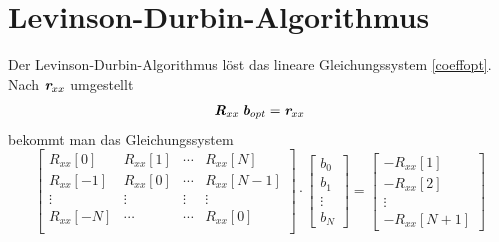\documentclass[
    10pt, %
    DIV12,
    english, %
    a5paper, %
    twoside, %
    titlepage, %
    parskip=half, %
    headings=small, %
    listof=totoc, %
    bibliography=totoc, %
    index=totoc, %
    captions=tableheading, %
    final %
]{scrbook}
\begin{document}
\section{Levinson-Durbin-Algorithmus}

Der Levinson-Durbin-Algorithmus löst das lineare Gleichungssystem \eqref{coeffopt}. Nach $\textit{\textbf{r}}_{xx}$ umgestellt
\begin{equation}
\textit{\textbf{R}}_{xx}\:\textit{\textbf{b}}_{opt}=\textit{\textbf{r}}_{xx}\nonumber
\end{equation}
bekommt man das Gleichungssystem
\begin{equation}\label{matrix1}
\begin{bmatrix} 
R_{xx}[0] & R_{xx}[1] & \cdots & R_{xx}[N]\\
R_{xx}[-1] & R_{xx}[0] & \cdots & R_{xx}[N-1]\\
\vdots & \vdots & \vdots & \vdots\\
R_{xx}[-N] & \cdots & \cdots & R_{xx}[0]\\
\end{bmatrix} 
\cdot
\begin{bmatrix} 
b_0\\
b_1\\
\vdots\\
b_N
\end{bmatrix} 
=
\begin{bmatrix} 
-R_{xx}[1]\\
-R_{xx}[2]\\
\vdots\\
-R_{xx}[N+1]
\end{bmatrix} \nonumber
\end{equation}
\end{document}
